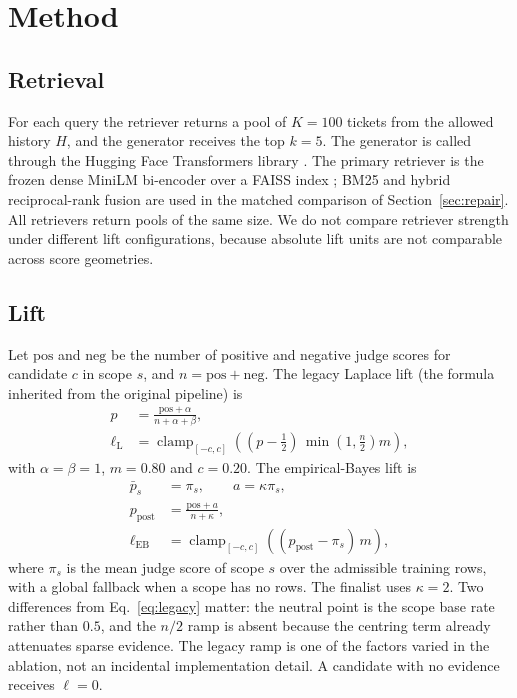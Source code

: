 \section{Method}
\label{sec:method}

\subsection{Retrieval}
For each query the retriever returns a pool of $K=100$ tickets from the allowed
history $H$, and the generator receives the top $k=5$. The generator is called
through the Hugging Face Transformers library \cite{b29}. The primary retriever is
the frozen dense MiniLM bi-encoder \cite{b2,b28} over a FAISS index \cite{b3}; BM25
\cite{b4} and hybrid reciprocal-rank fusion \cite{b5} are used in the matched
comparison of Section~\ref{sec:repair}. All retrievers return pools of the same
size. We do not compare retriever strength under different lift configurations,
because absolute lift units are not comparable across score geometries.

\subsection{Lift}
Let $\mathrm{pos}$ and $\mathrm{neg}$ be the number of positive and negative judge
scores for candidate $c$ in scope $s$, and $n=\mathrm{pos}+\mathrm{neg}$. The
legacy Laplace lift (the formula inherited from the original pipeline) is
\begin{equation}
\begin{aligned}
p &= \frac{\mathrm{pos}+\alpha}{n+\alpha+\beta},\\
\ell_{\mathrm{L}} &= \operatorname{clamp}_{[-c,c]}\!\left(
(p-\tfrac12)\,\min\!\left(1,\tfrac{n}{2}\right)m\right),
\end{aligned}
\label{eq:legacy}
\end{equation}
with $\alpha=\beta=1$, $m=0.80$ and $c=0.20$. The empirical-Bayes lift is
\begin{equation}
\begin{aligned}
\bar p_s &= \pi_s,\qquad a=\kappa\pi_s,\\
p_{\mathrm{post}} &= \frac{\mathrm{pos}+a}{n+\kappa},\\
\ell_{\mathrm{EB}} &= \operatorname{clamp}_{[-c,c]}\!\left(
(p_{\mathrm{post}}-\pi_s)\,m\right),
\end{aligned}
\label{eq:eb}
\end{equation}
where $\pi_s$ is the mean judge score of scope $s$ over the admissible training
rows, with a global fallback when a scope has no rows. The finalist uses
$\kappa=2$. Two differences from Eq.~\ref{eq:legacy} matter: the neutral point is
the scope base rate rather than $0.5$, and the $n/2$ ramp is absent because the
centring term already attenuates sparse evidence. The legacy ramp is one of the
factors varied in the ablation, not an incidental implementation detail. A
candidate with no evidence receives $\ell=0$.

